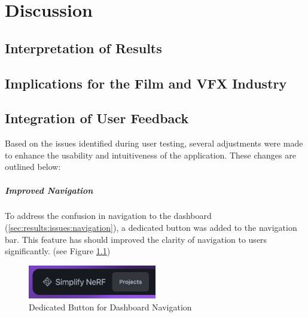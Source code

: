 %
\chapter{Discussion}
\label{sec:discussion}



\section{Interpretation of Results}
\label{sec:discussion:results}

\section{Implications for the Film and VFX Industry}
\label{sec:discussion:implications}

\section{Integration of User Feedback}
\label{sec:discussion:user-feedback}

Based on the issues identified during user testing, several adjustments were made to enhance the usability and intuitiveness of the application. These changes are outlined below:

\paragraph{Improved Navigation}
To address the confusion in navigation to the dashboard (\ref{sec:results:issues:navigation}), a dedicated button was added to the navigation bar. 
This feature has should improved the clarity of  navigation to users significantly. (see Figure \ref{fig:fix-1})

\begin{figure}[htb]
  \centering
	\includegraphics[width=0.5\textwidth]{figures/fix-1.png}
	\caption{Dedicated Button for Dashboard Navigation}
  \label{fig:fix-1}
\end{figure}

